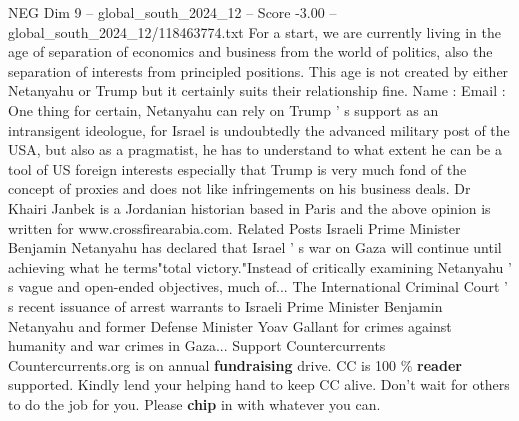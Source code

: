 \begin{textsample}{NEG Dim 9 – global\_south\_2024\_12 – Score -3.00 – global\_south\_2024\_12/118463774.txt}
For a start, we are currently living in the age of separation of economics and business from the world of politics, also the separation of interests from principled positions.
This age is not created by either Netanyahu or Trump but it certainly suits their relationship fine.
Name : Email : One thing for certain, Netanyahu can rely on Trump ' s support as an intransigent ideologue, for Israel is undoubtedly the advanced military post of the USA, but also as a pragmatist, he has to understand to what extent he can be a tool of US foreign interests especially that Trump is very much fond of the concept of proxies and does not like infringements on his business deals.
Dr Khairi Janbek is a Jordanian historian based in Paris and the above opinion is written for www.crossfirearabia.com.
Related Posts Israeli Prime Minister Benjamin Netanyahu has declared that Israel ' s war on Gaza will continue until achieving what he terms"total victory."Instead of critically examining Netanyahu ' s vague and open-ended objectives, much of...
The International Criminal Court ' s recent issuance of arrest warrants to Israeli Prime Minister Benjamin Netanyahu and former Defense Minister Yoav Gallant for crimes against humanity and war crimes in Gaza...
Support Countercurrents Countercurrents.org is on annual \textbf{fundraising} drive.
CC is 100 \% \textbf{reader} supported.
Kindly lend your helping hand to keep CC alive.
Don't wait for others to do the job for you.
Please \textbf{chip} in with whatever you can.

\end{textsample}
